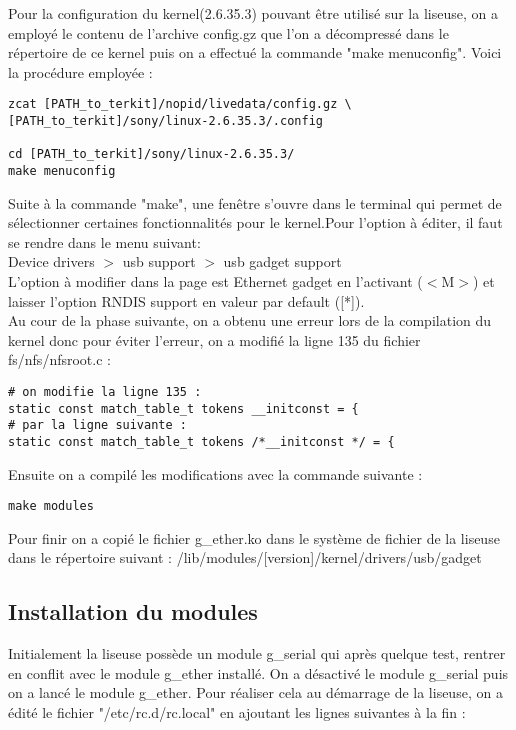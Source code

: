 Pour la configuration du kernel(2.6.35.3) pouvant être utilisé sur la liseuse, on a employé le contenu de l'archive config.gz que l'on a décompressé dans le répertoire de ce kernel puis on a effectué la commande "make menuconfig". Voici la procédure employée :

\begin{lstlisting}
zcat [PATH_to_terkit]/nopid/livedata/config.gz \
[PATH_to_terkit]/sony/linux-2.6.35.3/.config

cd [PATH_to_terkit]/sony/linux-2.6.35.3/
make menuconfig
\end{lstlisting}

Suite à la commande "make", une fenêtre s'ouvre dans le terminal qui permet de sélectionner certaines fonctionnalités pour le kernel.Pour l'option à éditer, il faut se rendre dans le menu suivant: \\
Device drivers $>$ usb support $>$ usb gadget support \\
L'option à modifier dans la page est Ethernet gadget en l'activant ($<$M$>$) et laisser l'option RNDIS support en valeur par default ([*]).\\

Au cour de la phase suivante, on a obtenu une erreur lors de la compilation du kernel donc pour éviter l'erreur, on a modifié la ligne 135 du fichier fs/nfs/nfsroot.c :

\begin{lstlisting}
# on modifie la ligne 135 :
static const match_table_t tokens __initconst = {
# par la ligne suivante :
static const match_table_t tokens /*__initconst */ = { 
\end{lstlisting} 

Ensuite on a compilé les modifications avec la commande suivante :

\begin{lstlisting}
make modules
\end{lstlisting}

Pour finir on a copié le fichier g_ether.ko dans le système de fichier de la liseuse dans le répertoire suivant : /lib/modules/[version]/kernel/drivers/usb/gadget
 
\subsection{Installation du modules}

Initialement la liseuse possède un module g_serial qui après quelque test, rentrer en conflit avec le module g_ether installé. On a désactivé le module g_serial puis on  a lancé le module g_ether. Pour réaliser cela au démarrage de la liseuse, on a édité le fichier "/etc/rc.d/rc.local" en ajoutant les lignes suivantes à la fin : 

